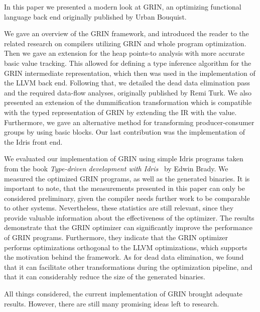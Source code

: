 \documentclass[main.tex]{subfiles}
\begin{document}
	
	In this paper we presented a modern look at GRIN, an optimizing functional language back end originally published by Urban Bouquist.
	
	We gave an overview of the GRIN framework, and introduced the reader to the related research on compilers utilizing GRIN and whole program optimization. Then we gave an extension for the heap points-to analysis with more accurate basic value tracking. This allowed for defining a type inference algorithm for the GRIN intermediate representation, which then was used in the implementation of the LLVM back end. Following that, we detailed the dead data elimination pass and the required data-flow analyses, originally published by Remi Turk. We also presented an extension of the dummification transformation which is compatible with the typed representation of GRIN by extending the IR with the  value. Furthermore, we gave an alternative method for transforming producer-consumer groups by using basic blocks. Our last contribution was the implementation of the Idris front end.
	
	We evaluated our implementation of GRIN using simple Idris programs taken from the book \textit{Type-driven development with Idris}~\cite{tdd-idris} by Edwin Brady. We measured the optimized GRIN programs, as well as the generated binaries. It is important to note, that the measurements presented in this paper can only be considered preliminary, given the compiler needs further work to be comparable to other systems. Nevertheless, these statistics are still relevant, since they provide valuable information about the effectiveness of the optimizer. The results demonstrate that the GRIN optimizer can significantly improve the performance of GRIN programs. Furthermore, they indicate that the GRIN optimizer performs optimizations orthogonal to the LLVM optimizations, which supports the motivation behind the framework. As for dead data elimination, we found that it can facilitate other transformations during the optimization pipeline, and that it can considerably reduce the size of the generated binaries.
	
	All things considered, the current implementation of GRIN brought adequate results. However, there are still many promising ideas left to research.
	
\end{document}
